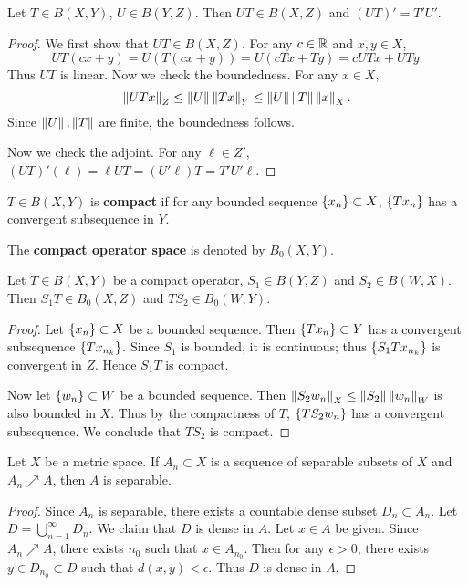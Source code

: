 \begin{proposition}
    Let $T\in B(X,Y)$, $U\in B(Y,Z)$. Then $UT\in B(X,Z)$ and 
    $(UT)' = T'U'$.
\end{proposition}
\begin{proof}
    We first show that $UT\in B(X,Z)$. For any $c\in\mathbb{R}$ and $x,y\in X$, 
    \begin{equation*}
        UT(cx+y) = U(T(cx + y)) = U(cTx + Ty) = cUTx + UTy.
    \end{equation*}
    Thus $UT$ is linear. Now we check the boundedness. For any $x\in X$, 
    \begin{equation*}
        \left\lVert {UTx} \right\rVert_Z \leq \left\lVert {U} \right\rVert\left\lVert {Tx} \right\rVert_Y \leq \left\lVert {U} \right\rVert\left\lVert {T} \right\rVert\left\lVert {x} \right\rVert_X.
    \end{equation*}
    Since $\left\lVert {U} \right\rVert,\left\lVert {T} \right\rVert$ are finite, the boundedness follows. 

    Now we check the adjoint. For any $\ell\in Z'$, $(UT)'(\ell) = \ell UT 
    = (U'\ell)T = T'U'\ell$. 
\end{proof} 

\begin{definition}
    $T\in B(X,Y)$ is \textbf{compact} if for any bounded sequence $\left\{ {x_n} \right\}\subset X$, 
    $\left\{ {Tx_n} \right\}$ has a convergent subsequence in $Y$.
\end{definition}

\begin{definition}
    The \textbf{compact operator space} is denoted by $B_0(X,Y)$. 
\end{definition}

\begin{proposition}
    Let $T\in B(X,Y)$ be a compact operator, $S_1\in B(Y,Z)$ and $S_2\in B(W,X)$. 
    Then $S_1T\in B_0(X,Z)$ and $TS_2\in B_0(W,Y)$.
\end{proposition}
\begin{proof}
    Let $\left\{ {x_n} \right\}\subset X$ be a bounded sequence. Then 
    $\left\{ {Tx_n} \right\}\subset Y$ has a convergent subsequence $\left\{ {Tx_{n_k}} \right\}$. 
    Since $S_1$ is bounded, it is continuous; thus $\left\{ {S_1Tx_{n_k}} \right\}$ is 
    convergent in $Z$. Hence $S_1T$ is compact. 

    Now let $\left\{ {w_n} \right\}\subset W$ be a bounded sequence. Then 
    $\left\lVert {S_2w_n} \right\rVert_X\leq\left\lVert {S_2} \right\rVert\left\lVert {w_n} \right\rVert_W$ is also bounded 
    in $X$. Thus by the compactness of $T$, $\left\{ {TS_2w_n} \right\}$ has a 
    convergent subsequence. We conclude that $TS_2$ is compact.
\end{proof}

\begin{lemma}\label{lem:increasing_separable}
    Let $X$ be a metric space. If $A_n\subset X$ is a sequence of 
    separable subsets of $X$ and $A_n\nearrow A$, then $A$ is 
    separable.
\end{lemma}
\begin{proof}
    Since $A_n$ is separable, there exists a countable dense 
    subset $D_n\subset A_n$. Let $D = \bigcup_{n=1}^\infty D_n$.
    We claim that $D$ is dense in $A$. Let $x\in A$ be given. 
    Since $A_n\nearrow A$, there exists $n_0$ such that $x\in A_{n_0}$. 
    Then for any $\epsilon>0$, there exists $y\in D_{n_0}\subset D$ such 
    that $d(x,y)<\epsilon$. Thus $D$ is dense in $A$.
\end{proof}

